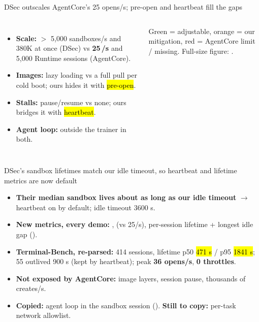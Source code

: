 \begin{frame}[t]{DSec outscales AgentCore's 25 opens/s; pre-open and heartbeat fill the gaps}
\begin{columns}[T]
\centering
{}
\vspace{4mm}
\begin{itemize}\footnotesize\setlength{\itemsep}{1.5mm}
\item \textbf{Scale:} $>$ 5,000 sandboxes/s and 380K at once (DSec) vs \textbf{25\,/s} and 5,000 Runtime sessions (AgentCore).
\item \textbf{Images:} lazy loading vs a full pull per cold boot; ours hides it with \hl{pre-open}.
\item \textbf{Stalls:} pause/resume vs none; ours bridges it with \hl{heartbeat}.
\item \textbf{Agent loop:} outside the trainer in both.
\end{itemize}
{\scriptsize\color{inkmuted}Green = adjustable, orange = our mitigation, red = AgentCore limit / missing. Full-size figure: .\par}
\end{columns}
\end{frame}

\begin{frame}{DSec's sandbox lifetimes match our idle timeout, so heartbeat and lifetime metrics are now default}
\begin{itemize}\footnotesize\setlength{\itemsep}{2mm}
\item \textbf{Their median sandbox lives about as long as our idle timeout} $\rightarrow$ heartbeat on by default; idle timeout 3600 s.
\item \textbf{New metrics, every demo:} ,  (vs 25/s), per-session lifetime + longest idle gap ().
\item \textbf{Terminal-Bench, re-parsed:} 414 sessions, lifetime p50 \hl{471 s} / p95 \hl{1841 s}; 55 outlived 900 s (kept by heartbeat); peak \textbf{36 opens/s}, \textbf{0 throttles}.
\item \textbf{Not exposed by AgentCore:} image layers, session pause, thousands of creates/s.
\item \textbf{Copied:} agent loop in the sandbox session (). \textbf{Still to copy:} per-task network allowlist.
\end{itemize}
\end{frame}

